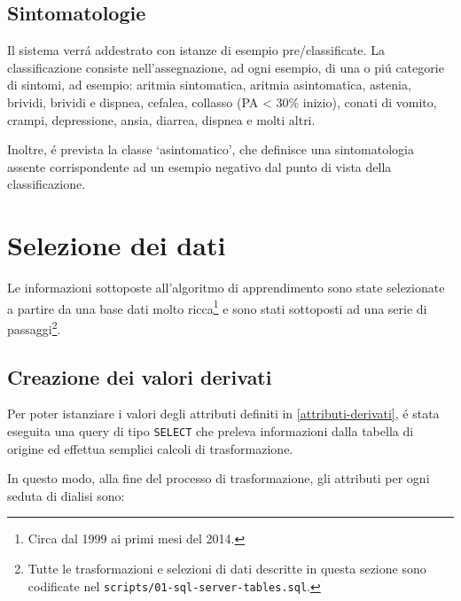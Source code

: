 \documentclass[preprint]{acm_proc_article-sp}
\begin{document}
\subsection{Sintomatologie}
Il sistema verr\'a addestrato con istanze di esempio pre\-/classificate. La classificazione consiste nell'assegnazione, ad ogni esempio, di una o pi\'u categorie di sintomi, ad esempio: aritmia sintomatica, aritmia asintomatica, astenia, brividi, brividi e dispnea, cefalea, collasso (PA < 30\% inizio), conati di vomito, crampi, depressione, ansia, diarrea, dispnea e molti altri.

Inoltre, \'e prevista la classe `asintomatico', che definisce una sintomatologia assente corrispondente ad un esempio negativo dal punto di vista della classificazione.

\section{Selezione dei dati}
Le informazioni sottoposte all'algoritmo di apprendimento sono state selezionate a partire da una base dati molto ricca\footnote{Circa dal 1999 ai primi mesi del 2014.} e sono stati sottoposti ad una serie di passaggi\footnote{Tutte le trasformazioni e selezioni di dati descritte in questa sezione sono codificate nel \texttt{scripts/01-sql-server-tables.sql}.}.

\subsection{Creazione dei valori derivati}
Per poter istanziare i valori degli attributi definiti in \ref{attributi-derivati}, \'e stata eseguita una query di tipo \texttt{SELECT} che preleva informazioni dalla tabella di origine ed effettua semplici calcoli di trasformazione.

In questo modo, alla fine del processo di trasformazione, gli attributi per ogni seduta di dialisi sono:
\end{document}
